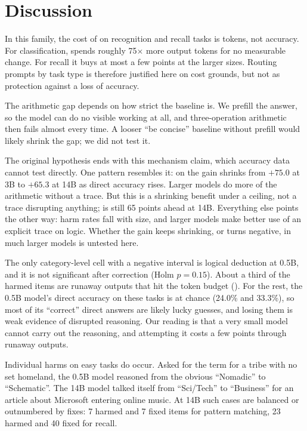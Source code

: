 \section{Discussion}
\label{sec:discussion}

In this family, the cost of \CoT on recognition and recall tasks is tokens, not accuracy.
For classification, \CoT spends roughly 75$\times$ more output tokens for no measurable change.
For recall it buys at most a few points at the larger sizes.
Routing prompts by task type is therefore justified here on cost grounds, but not as protection against a loss of accuracy.

The arithmetic gap depends on how strict the baseline is.
We prefill the answer, so the model can do no visible working at all, and three-operation arithmetic then fails almost every time.
A looser ``be concise'' baseline without prefill would likely shrink the gap; we did not test it.

The original hypothesis ends with this mechanism claim, which accuracy data cannot test directly.
One pattern resembles it: on \gsm the \CoT gain shrinks from $+75.0$ at 3B to $+65.3$ at 14B as direct accuracy rises.
Larger models do more of the arithmetic without a trace.
But this is a shrinking benefit under a ceiling, not a trace disrupting anything; \CoT is still 65 points ahead at 14B.
Everything else points the other way: harm rates fall with size, and larger models make better use of an explicit trace on logic.
Whether the gain keeps shrinking, or turns negative, in much larger models is untested here.

The only category-level cell with a negative interval is logical deduction at 0.5B, and it is not significant after correction (Holm $p = 0.15$).
About a third of the harmed items are runaway outputs that hit the token budget ().
For the rest, the 0.5B model's direct accuracy on these tasks is at chance (24.0\% and 33.3\%), so most of its ``correct'' direct answers are likely lucky guesses, and losing them is weak evidence of disrupted reasoning.
Our reading is that a very small model cannot carry out the reasoning, and attempting it costs a few points through runaway outputs.

Individual harms on easy tasks do occur.
Asked for the term for a tribe with no set homeland, the 0.5B model reasoned from the obvious ``Nomadic'' to ``Schematic''.
The 14B model talked itself from ``Sci/Tech'' to ``Business'' for an article about Microsoft entering online music.
At 14B such cases are balanced or outnumbered by fixes: 7 harmed and 7 fixed items for pattern matching, 23 harmed and 40 fixed for recall.

